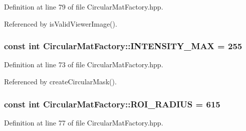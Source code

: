 \-Definition at line 79 of file \-Circular\-Mat\-Factory.\-hpp.



\-Referenced by is\-Valid\-Viewer\-Image().

\hypertarget{classmultiscale_1_1analysis_1_1CircularMatFactory_a37f5cabf6d03d157cf96fb745e1da0ca}{
\subsubsection[{\-I\-N\-T\-E\-N\-S\-I\-T\-Y\-\_\-\-M\-A\-X}]{\setlength{\rightskip}{0pt plus 5cm}const int {\bf \-Circular\-Mat\-Factory\-::\-I\-N\-T\-E\-N\-S\-I\-T\-Y\-\_\-\-M\-A\-X} = 255}}\label{classmultiscale_1_1analysis_1_1CircularMatFactory_a37f5cabf6d03d157cf96fb745e1da0ca}


\-Definition at line 73 of file \-Circular\-Mat\-Factory.\-hpp.



\-Referenced by create\-Circular\-Mask().

\hypertarget{classmultiscale_1_1analysis_1_1CircularMatFactory_af26e9372a9bfb4428e9bdef952afedff}{
\subsubsection[{\-R\-O\-I\-\_\-\-R\-A\-D\-I\-U\-S}]{\setlength{\rightskip}{0pt plus 5cm}const int {\bf \-Circular\-Mat\-Factory\-::\-R\-O\-I\-\_\-\-R\-A\-D\-I\-U\-S} = 615}}\label{classmultiscale_1_1analysis_1_1CircularMatFactory_af26e9372a9bfb4428e9bdef952afedff}


\-Definition at line 77 of file \-Circular\-Mat\-Factory.\-hpp.



